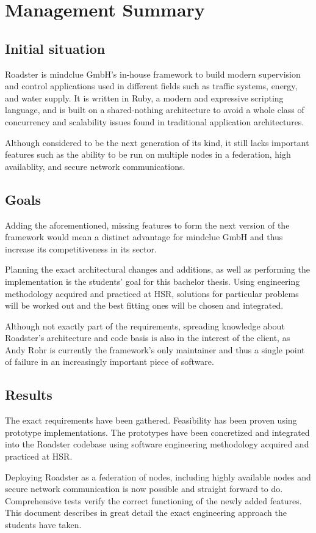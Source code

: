 \part{Management Summary}\label{part:mgmtsummary}
\chapter*{Initial situation}
Roadster is mindclue GmbH's in-house framework to build modern supervision and
control applications used in different fields such as traffic systems, energy,
and water supply. It is written in Ruby, a modern and expressive scripting
language, and is built on a shared-nothing architecture to avoid a whole class
of concurrency and scalability issues found in traditional application
architectures.

Although considered to be the next generation of its kind, it still lacks
important features such as the ability to be run on multiple
nodes in a federation, high availablity, and secure network communications.

\chapter*{Goals}
Adding the aforementioned, missing features to form the next version of the
framework would mean a distinct advantage for mindclue GmbH and thus increase
its competitiveness in its sector.

Planning the exact architectural changes and additions, as well as performing
the implementation is the students' goal for this bachelor thesis. Using
engineering methodology acquired and practiced at HSR, solutions for particular problems
will be worked out and the best fitting ones will be chosen and integrated.

Although not exactly part of the requirements, spreading knowledge about Roadster's
architecture and code basis is also in the interest of the client, as Andy Rohr
is currently the framework's only maintainer and thus a single point of failure
in an increasingly important piece of software.

\chapter*{Results}
The exact requirements have been gathered. Feasibility has been proven using
prototype implementations. The prototypes have been concretized and integrated
into the Roadster codebase using software engineering methodology acquired and
practiced at HSR.

Deploying Roadster as a federation of nodes, including highly available nodes
and secure network communication is now possible and straight forward to do.
Comprehensive tests verify the correct functioning of the newly added features.
This document describes in great detail the exact engineering approach the
students have taken.
